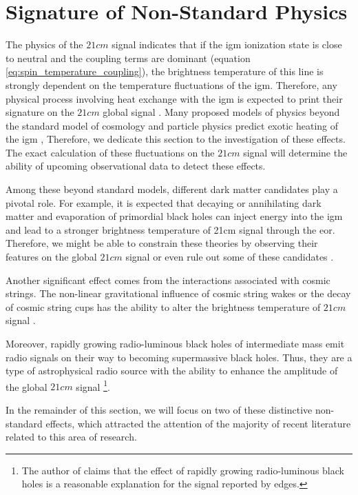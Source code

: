 \documentclass[12pt, TexShade, letterpaper]{report}
\begin{document}
\section{Signature of Non-Standard Physics}
\label{chap:global21cm,sub:non_standard}
The physics of the $21cm$ signal indicates that if the \gls{igm} ionization state is close to neutral and the coupling terms are dominant (equation \ref{eq:spin_temperature_coupling}), the brightness temperature of this line is strongly dependent on the temperature fluctuations of the \gls{igm}. Therefore, any physical process involving heat exchange with the \gls{igm} is expected to print their signature on the $21cm$ global signal \cite{21century}. Many proposed models of physics beyond the standard model of cosmology and particle physics predict exotic heating of the 
\gls{igm} \cite{21century}, Therefore, we dedicate this section to the investigation of these effects. The exact calculation of these fluctuations on the $21cm$ signal will determine the ability of upcoming observational data to detect these effects.\par
Among these beyond standard models, different dark matter candidates play a pivotal role. For example, it is expected that decaying or annihilating dark matter and evaporation of primordial black holes can inject energy into the \gls{igm} and lead to a stronger brightness temperature of 21cm signal through the \gls{eor}. Therefore, we might be able to constrain these theories by observing their features on the global $21cm$ signal \cite{primordial_bh, new_physics_thesis, primordial_bh_binary, 21limit_dm_bh, bound_dm} or even rule out some of these candidates \cite{rule_out}.\par
Another significant effect comes from the interactions associated with cosmic strings. The non-linear gravitational influence of cosmic string wakes or the decay of cosmic string cups has the ability to alter the brightness temperature of $21cm$ signal \cite{WF_effect_oscar, cosmic_string_oscar, string_loop_robert}. \par
Moreover, rapidly growing radio-luminous black holes of intermediate mass emit radio signals on their way to becoming supermassive black holes. Thus, they are a type of astrophysical radio source with the ability to enhance the amplitude of the global $21cm$ signal \cite{bh_cosmioc_dawn} \footnote{The author of \cite{bh_cosmioc_dawn} claims that the effect of rapidly growing radio-luminous black holes is a reasonable explanation for the signal reported by \gls{edges}.}. \par
In the remainder of this section, we will focus on two of these distinctive non-standard effects, which attracted the attention of the majority of recent literature related to this area of research.\par
\end{document}
